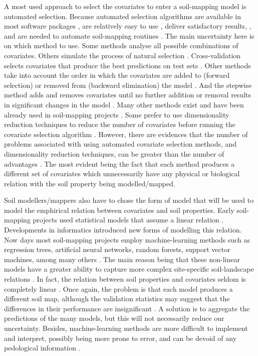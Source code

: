 A most used approach to select the covariates to enter a soil-mapping model is automated selection.
Because automated selection algorithms are available in most software packages \citep{Harrell2001}, 
are relatively easy to use \citep{DraperEtAl1971}, deliver satisfactory results, 
\citep{HenglEtAl2004}, and are needed to automate soil-mapping routines \citep{HenglEtAl2014}. The 
main uncertainty here is on which method to use. Some methods analyse all possible combinations of 
covariates. Others simulate the process of natural selection \citep{AndersenEtAl2010}. 
Cross-validation selects covariates that produce the best predictions on test sets 
\citep{GuyonEtAl2003}. Other methods take into account the order in which the covariates are added 
to (forward selection) or removed from (backward elimination) the model \citep{LarkEtAl2007a}. And 
the stepwise method adds and removes covariates until no further addition or removal results in 
significant changes in the model \citep{Efroymson1962}. Many other methods exist and have been 
already used in soil-mapping projects \citep{PoggioEtAl2013, NussbaumEtAl2014}. Some prefer to use 
dimensionality reduction techniques to reduce the number of covariates \citep{Massy1965} before 
running the covariate selection algorithm \citep{tenCatenEtAl2011a, HenglEtAl2014}. However, there 
are evidences that the number of problems associated with using automated covariate selection 
methods, and dimensionality reduction techniques, can be greater than the number of advantages 
\citep{FarrarEtAl1967, Jackson1993, Chatfield1995, Edirisooriya1995, Harrell2001, Jolliffe2002, 
PeresNetoEtAl2005, LarkEtAl2007a}. The most evident being the fact that each method produces a 
different set of covariates which unnecessarily have any physical or biological relation with the 
soil property being modelled/mapped.
 
Soil modellers/mappers also have to chose the form of model that will be used to model the 
emphirical relation between covariates and soil properties. Early soil-mapping projects used 
statistical models that assume a linear relation \citep{MooreEtAl1993, OdehEtAl1994}.
Developments in informatics introduced new forms of modelling this relation. Now days most 
soil-mapping projects employ machine-learning methods such as regression trees, artificial neural 
networks, random forests, support vector machines, among many others \citep{HeungEtAl2016}. The 
main reason being that these non-linear models have a greater ability to capture more complex 
site-specific soil-landscape relations \citep{Grunwald2009}. In fact, the relation between soil 
properties and covariates seldom is completely linear \citep{McKenzieEtAl1999}. Once again, the 
problem is that each model produces a different soil map, although the validation statistics may 
suggest that the differences in their performance are insignificant \citep{HeungEtAl2016}. A solution
is to aggregate the predictions of the many models, but this will not necessarily reduce our 
uncertainty. Besides, machine-learning methods are more difficult to implement and interpret, 
possibly being more prone to error, and can be devoid of any pedological information 
\citep{Grunwald2009}.

